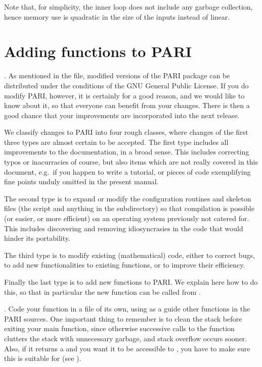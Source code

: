 
Note that, for simplicity, the inner loop does not include any garbage
collection, hence memory use is quadratic in the size of the inputs instead
of linear.

\section{Adding functions to PARI}
.
%
As mentioned in the  file, modified versions of the PARI package
can be distributed under the conditions of the GNU General Public License. If
you do modify PARI, however, it is certainly for a good reason, and we
would like to know about it, so that everyone can benefit from your changes.
There is then a good chance that your improvements are incorporated into the
next release.

We classify changes to PARI into four rough classes, where changes of the
first three types are almost certain to be accepted. The first type includes
all improvements to the documentation, in a broad sense. This includes
correcting typos or inacurracies of course, but also items which are not
really covered in this document, e.g.~if you happen to write a tutorial,
or pieces of code exemplifying fine points unduly omitted in the present
manual.

The second type is to expand or modify the configuration routines and skeleton
files (the  script and anything in the 
subdirectory) so that compilation is possible (or easier, or more efficient)
on an operating system previously not catered for. This includes discovering
and removing idiosyncrasies in the code that would hinder its portability.

The third type is to modify existing (mathematical) code, either to correct
bugs, to add new functionalities to existing functions, or to improve their
efficiency.

Finally the last type is to add new functions to PARI. We explain here how
to do this, so that in particular the new function can be called from .

.\label{se:coding_guidelines}
\noindent
Code your function in a file of its own, using as a guide other functions
in the PARI sources. One important thing to remember is to clean the stack
before exiting your main function, since otherwise successive calls to
the function clutters the stack with unnecessary garbage, and stack
overflow occurs sooner. Also, if it returns a  and you want it
to be accessible to , you have to make sure this  is
suitable for  (see ).


